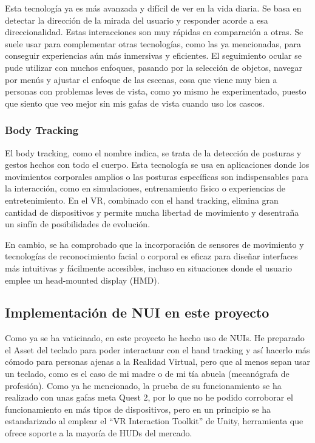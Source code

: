 Esta tecnología ya es más avanzada y difícil de ver en la vida diaria. Se basa en detectar la dirección de la mirada del usuario y responder acorde a esa direccionalidad. Estas interacciones son muy rápidas en comparación a otras. Se suele usar para complementar otras tecnologías, como las ya mencionadas, para conseguir experiencias aún más inmersivas y eficientes. El seguimiento ocular se pude utilizar con muchos enfoques, pasando por la selección de objetos, navegar por menús y ajustar el enfoque de las escenas, cosa que viene muy bien a personas con problemas leves de vista, como yo mismo he experimentado, puesto que siento que veo mejor sin mis gafas de vista cuando uso los cascos. \cite{RedefiningNUI}

\subsubsection{Body Tracking}


El body tracking, como el nombre indica, se trata de la detección de posturas y gestos hechos con todo el cuerpo. Esta tecnología se usa en aplicaciones donde los movimientos corporales amplios o las posturas específicas son indispensables para la interacción, como en simulaciones, entrenamiento físico o experiencias de entretenimiento. En el VR, combinado con el hand tracking, elimina gran cantidad de dispositivos y permite mucha libertad de movimiento y desentraña un sinfín de posibilidades de evolución. \cite{GestureOverview} \cite{ZoomFwd} 


En cambio, se ha comprobado que la incorporación de sensores de movimiento y tecnologías de reconocimiento facial o corporal es eficaz para diseñar interfaces más intuitivas y fácilmente accesibles, incluso en situaciones donde el usuario emplee un head-mounted display (HMD). \cite{AffordanceHMD} \cite{FacialGesture} 

\subsection{Implementación de NUI en este proyecto}

Como ya se ha vaticinado, en este proyecto he hecho uso de NUIs. He preparado el Asset del teclado para poder interactuar con el hand tracking y así hacerlo más cómodo para personas ajenas a la Realidad Virtual, pero que al menos sepan usar un teclado, como es el caso de mi madre o de mi tía abuela (mecanógrafa de profesión). Como ya he mencionado, la prueba de su funcionamiento se ha realizado con unas gafas meta Quest 2, por lo que no he podido corroborar el funcionamiento en más tipos de dispositivos, pero en un principio se ha estandarizado al emplear el ``VR Interaction Toolkit''  de Unity, herramienta que ofrece soporte a la mayoría de HUDs del mercado.

